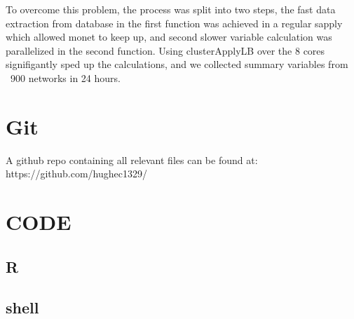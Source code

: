 \documentclass[12pt]{article}
\begin{document}
		To overcome this problem, the process was split into two steps, the fast data extraction from database in the first function was achieved in a regular sapply which allowed monet to keep up, and second slower variable calculation was parallelized in the second function.
		Using clusterApplyLB over the 8 cores signifigantly sped up the calculations, and we collected summary variables from ~900 networks in 24 hours.

	\section{Git}
		 A github repo containing all relevant files can be found at: https://github.com/hughec1329/

\newpage
	\section{CODE}
	\subsection{R}
		
	\newpage
	\subsection{shell}
		
		
		
\end{document}
